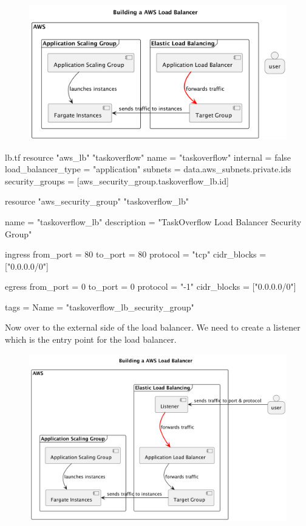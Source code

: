 \documentclass{csse4400}
\begin{document}
\begin{figure}[H]
  \begin{center}
    \includegraphics[scale=0.2]{diagrams/lb3fargate}
  \end{center}
\end{figure}

\begin{code}[language=terraform,numbers=none,keepspaces=true]{lb.tf}
resource "aws_lb" "taskoverflow" {
  name               = "taskoverflow"
  internal           = false
  load_balancer_type = "application"
  subnets            = data.aws_subnets.private.ids
  security_groups    = [aws_security_group.taskoverflow_lb.id]
}

resource "aws_security_group" "taskoverflow_lb" {
  name        = "taskoverflow_lb"
  description = "TaskOverflow Load Balancer Security Group"

  ingress {
    from_port     = 80
    to_port       = 80
    protocol      = "tcp"
    cidr_blocks   = ["0.0.0.0/0"]
  }

  egress {
    from_port     = 0
    to_port       = 0
    protocol      = "-1"
    cidr_blocks   = ["0.0.0.0/0"]
  }

  tags = {
    Name = "taskoverflow_lb_security_group"
  }
}
\end{code}

Now over to the external side of the load balancer.
We need to create a listener which is the entry point for the load balancer.

\begin{figure}[H]
  \begin{center}
    \includegraphics[scale=0.2]{diagrams/lb4fargate}
  \end{center}
\end{figure}
\end{document}
